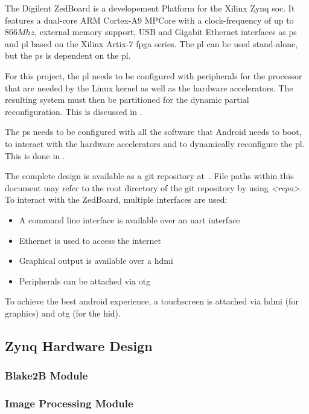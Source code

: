 The Digilent ZedBoard is a developement Platform for the Xilinx Zynq \gls{soc}.
It features a dual-core ARM Cortex-A9 MPCore with a clock-frequency of up to
$866 Mhz$, external memory support, USB and Gigabit Ethernet interfaces as
\gls{ps} and \gls{pl} based on the Xilinx Artix-7 \gls{fpga} series.
The \gls{pl} can be used stand-alone, but the \gls{ps} is dependent on the
\gls{pl}.

For this project, the \gls{pl} needs to be configured with peripherals for the
processor that are needed by the Linux kernel as well as the hardware
accelerators.
The resulting system must then be partitioned for the dynamic partial
reconfiguration.
This is discussed in .

The \gls{ps} needs to be configured with all the software that Android needs to
boot, to interact with the hardware accelerators and to dynamically reconfigure
the \gls{pl}.
This is done in .

The complete design is available as a git repository at~\cite{repo}.
File paths within this document may refer to the root directory of the git
repository by using \emph{<repo>}.
To interact with the ZedBoard, multiple interfaces are used:
\begin{itemize}
	\item A command line interface is available over an \gls{uart} interface
	\item Ethernet is used to access the internet
	\item Graphical output is available over a \gls{hdmi}
	\item Peripherals can be attached via \gls{otg}
\end{itemize}
To achieve the best android experience, a touchscreen is attached via \gls{hdmi}
(for graphics) and \gls{otg} (for the \gls{hid}).
\subsection{Zynq Hardware Design}\label{ssec:zynqhardwaredesign}

\subsubsection{Blake2B Module}\label{sssec:blake2bmodule}

\subsubsection{Image Processing Module}\label{sssec:imageprocessingmodule}

